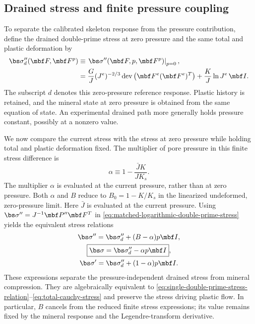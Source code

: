 \subsection{Drained stress and finite pressure coupling}
\label{sec:drained-stress-and-pressure-coupling}

To separate the calibrated skeleton response from the pressure contribution,
define the drained double-prime stress at zero pressure and the same total
and plastic deformation by
\begin{align*}
 \bs\sigma^{\prime\prime}_d(\mbf F,\mbf F^p)
 &\equiv\left.\bs\sigma^{\prime\prime}(\mbf F,p,\mbf F^p)\right|_{p=0},
\\
 &=\frac{G}{J}(J^e)^{-2/3}
 \operatorname{dev}\left(\mbf F^e(\mbf F^e)^T\right)
 +\frac{K}{J}\ln J^e\,\mbf I.
\end{align*}
The subscript \(d\) denotes this zero-pressure reference response.
Plastic history is retained, and the mineral state at zero pressure is
obtained from the same equation of state.  An experimental drained path
more generally holds pressure constant, possibly at a nonzero value.

We now compare the current stress with the stress at zero pressure while
holding total and plastic deformation fixed.  The multiplier of pore
pressure in this finite stress difference is
\begin{equation*}
 \alpha\equiv 1-\frac{\bar{J} K}{JK_s}.
\end{equation*}
The multiplier \(\alpha\) is evaluated at the current pressure, rather than
at zero pressure.  Both \(\alpha\) and \(B\) reduce to \(B_0=1-K/K_s\) in the
linearized undeformed, zero-pressure limit.
Here \(\bar J\) is evaluated at the current pressure.  Using
\(\bs\sigma^{\prime\prime}=J^{-1}\mbf P^{\prime\prime}\mbf F^T\) in
\eqref{eq:matched-logarithmic-double-prime-stress} yields the equivalent
stress relations
\begin{gather}
 \bs\sigma^{\prime\prime}
 =\bs\sigma^{\prime\prime}_d+(B-\alpha)p\mbf I,
 \notag
\\
 \boxed{\bs\sigma=\bs\sigma^{\prime\prime}_d-\alpha p\mbf I},
 \label{eq:total-stress-drained-pressure-split}\\
 \bs\sigma^{\prime}
 =\bs\sigma^{\prime\prime}_d+(1-\alpha)p\mbf I.
 \label{eq:single-prime-drained-pressure-split}
\end{gather}
These expressions separate the pressure-independent drained stress from
mineral compression.  They are algebraically equivalent to
\eqref{eq:single-double-prime-stress-relation}--\eqref{eq:total-cauchy-stress}
and preserve the stress driving plastic flow.  In particular, \(B\)
cancels from the reduced finite stress expressions; its value remains
fixed by the mineral response and the Legendre-transform derivative.

